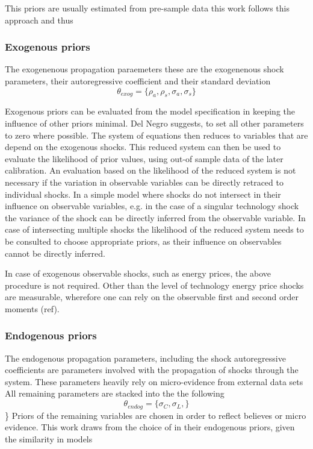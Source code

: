 \documentclass[11pt,a4paper,english]{article} %
\begin{document}
	This priors are usually estimated from pre-sample data \cite{herbst_bayesian_2014}
	this work follows this approach and thus 
	
	
	
	
	\subsubsection{Exogenous priors}
	The exogenenous propagation paraemeters 
	these are the exogenenous shock parameters, their autoregressive coefficient and their standard deviation
	\[
		\theta_{exog} = \{\rho_a, \rho_s, \sigma_a, \sigma_s \}
	\]
	
	Exogenous priors can be evaluated from the model specification in keeping the influence of other priors minimal. Del Negro suggests, to set all other parameters to zero where possible. The system of equations then reduces to variables that are depend on the exogenous shocks. This reduced system can then be used to evaluate the likelihood of prior values, using out-of sample data of the later calibration. 
	An evaluation based on the likelihood of the reduced system is not necessary if the variation in observable variables can be directly retraced to individual shocks. In a simple model where shocks do not intersect in their influence on observable variables, e.g. in the case of a singular technology shock the variance of the shock can be directly inferred from the observable variable. In case of intersecting multiple shocks the likelihood of the reduced system needs to be consulted to choose appropriate priors, as their influence on observables cannot be directly inferred. 
	
	In case of exogenous observable shocks, such as energy prices, the above procedure is not required. Other than the level of technology energy price shocks are measurable, wherefore one can rely on the observable first and second order moments (ref).
	
	
	\subsubsection{Endogenous priors}
	The endogenous propagation parameters, including the shock autoregressive coefficients are parameters involved with the propagation of shocks through the system.
	These parameters heavily rely on micro-evidence from external data sets \cite{del_negro_forming_2008}
	All remaining parameters are stacked into the the following
	\[
		\theta_{endog} = \{\sigma_C, \sigma_L, \}
	\]\}
	Priors of the remaining variables are chosen in order to reflect believes or micro evidence. This work draws from the choice of \cite{del_negro_forming_2008} in their endogenous priors, given the similarity in models
	
\end{document}
